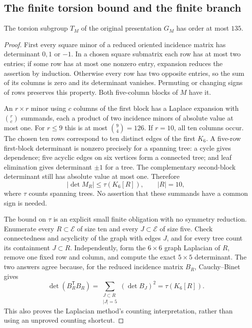 \subsection{The finite torsion bound and the finite branch}
\begin{lemma}\label{lem:bound}
The torsion subgroup $T_M$ of the original presentation $G_M$ has order
at most $135$.
\end{lemma}
\begin{proof}
First every square minor of a reduced oriented incidence matrix has
determinant $0,1$ or $-1$. In a chosen square submatrix each row has
at most two entries; if some row has at most one nonzero entry, expansion
reduces the assertion by induction. Otherwise every row has two opposite
entries, so the sum of its columns is zero and its determinant vanishes.
Permuting or changing signs of rows preserves this property. Both
five-column blocks of $M$ have it.

An $r\times r$ minor using $c$ columns of the first block has a Laplace
expansion with $\binom rc$ summands, each a product of two incidence
minors of absolute value at most one. For $r\le9$ this is at most
$\binom94=126$. If $r=10$, all ten columns occur. The chosen ten rows
correspond to ten distinct edges of the first $K_6$. A five-row
first-block determinant is nonzero precisely for a spanning tree:
a cycle gives dependence; five acyclic edges on six vertices form a
connected tree; and leaf elimination gives determinant $\pm1$ for a
tree. The complementary second-block determinant still has absolute
value at most one. Therefore
\[
 |\det M_R|\le\tau(K_6[R]),\qquad |R|=10,
\]
where $\tau$ counts spanning trees. No assertion that these summands
have a common sign is needed.

The bound on $\tau$ is an explicit small finite obligation with no
symmetry reduction. Enumerate every $R\subset\mathcal E$ of size ten
and every $J\subset\mathcal E$ of size five. Check connectedness and
acyclicity of the graph with edges $J$, and for every tree count its
containment $J\subset R$. Independently, form the $6\times6$ graph
Laplacian of $R$, remove one fixed row and column, and compute the exact
$5\times5$ determinant. The two answers agree because, for the reduced
incidence matrix $B_R$, Cauchy--Binet gives
\[
 \det(B_R^{\mathsf T}B_R)
   =\sum_{\substack{J\subset R\\|J|=5}}(\det B_J)^2
   =\tau(K_6[R]).
\]
This also proves the Laplacian method's counting interpretation, rather
than using an unproved counting shortcut.


\end{proof}
